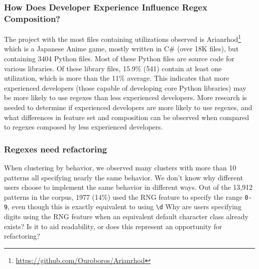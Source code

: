 \subsubsection{How Does Developer Experience Influence Regex Composition?}
The project with the most files containing utilizations observed is Arianrhod\footnote{\url{https://github.com/Ouroboros/Arianrhod}} which is a Japanese Anime game, mostly written in C\# (over 18K files), but containing 3404 Python files.  Most of these Python files are source code for various libraries.  Of these library files, 15.9\% (541) contain at least one utilization, which is more than the 11\% average.  This indicates that more experienced developers (those capable of developing core Python libraries) may be more likely to use regexes than less experienced developers.  More research is needed to determine if experienced developers are more likely to use regexes, and what differences in feature set and composition can be observed when compared to regexes composed by less experienced developers.

\subsubsection{Regexes need refactoring}
When clustering by behavior, we observed many clusters with more than 10 patterns all specifying nearly the same behavior.  We don't know why different users choose to implement the same behavior in different ways.  Out of the 13,912 patterns in the corpus, 1977 (14\%) used the RNG feature to specify the range \verb•0-9•, even though this is exactly equivalent to using \verb•\d•  Why are users specifying digits using the RNG feature when an equivalent default character class already exists?  Is it to aid readability, or does this represent an opportunity for refactoring?







